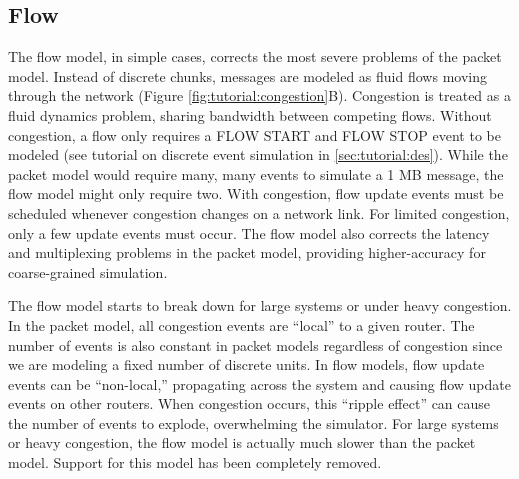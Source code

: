\subsection{Flow}
\label{subsec:tutorial:flow}
The flow model, in simple cases, corrects the most severe problems of the packet model.
Instead of discrete chunks, messages are modeled as fluid flows moving through the network (Figure \ref{fig:tutorial:congestion}B).
Congestion is treated as a fluid dynamics problem, sharing bandwidth between competing flows.
Without congestion, a flow only requires a FLOW START and FLOW STOP event to be modeled (see tutorial on discrete event simulation in \ref{sec:tutorial:des}).
While the packet model would require many, many events to simulate a 1 MB message, the flow model might only require two.
With congestion, flow update events must be scheduled whenever congestion changes on a network link.  
For limited congestion, only a few update events must occur.
The flow model also corrects the latency and multiplexing problems in the packet model, providing higher-accuracy for coarse-grained simulation.

The flow model starts to break down for large systems or under heavy congestion.
In the packet model, all congestion events are ``local'' to a given router.  
The number of events is also constant in packet models regardless of congestion since we are modeling a fixed number of discrete units.
In flow models, flow update events can be ``non-local,'' propagating across the system and causing flow update events on other routers.
When congestion occurs, this ``ripple effect'' can cause the number of events to explode, overwhelming the simulator.
For large systems or heavy congestion, the flow model is actually much slower than the packet model. Support for this model has been completely removed.


